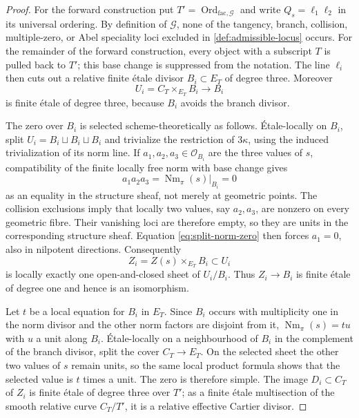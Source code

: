 \documentclass[10pt]{amsart}
\numberwithin{equation}{section}
\theoremstyle{definition}
\theoremstyle{remark}
\newcommand{\Nm}{\operatorname{Nm}}
\begin{document}
\begin{proof}
For the forward construction put
$T'=\operatorname{Ord}_{\mathrm{fac},\mathscr G}$ and write
$Q_s=\ell_1\ell_2$ in its universal ordering.  By definition of
$\mathscr G$, none of the tangency, branch, collision, multiple-zero, or Abel
speciality loci excluded in \cref{def:admissible-locus} occurs.  For the
remainder of the forward construction, every object with a subscript $T$ is
pulled back to $T'$; this base change is suppressed from the notation.
The line $\ell_i$ then
cuts out a relative finite \'etale divisor $B_i\subset E_T$ of degree three.
Moreover
\[
 U_i=C_T\times_{E_T}B_i\longrightarrow B_i
\]
is finite \'etale of degree three, because $B_i$ avoids the branch divisor.

The zero over $B_i$ is selected scheme-theoretically as follows.  \'Etale-locally on
$B_i$, split $U_i=B_i\sqcup B_i\sqcup B_i$ and trivialize the restriction
of $3\kappa$, using the induced trivialization of its norm line.  If
$a_1,a_2,a_3\in\mathcal O_{B_i}$ are the three values of $s$, compatibility
of the finite locally free norm with base change gives
\begin{equation}
 a_1a_2a_3=\Nm_\pi(s)|_{B_i}=0
\label{eq:split-norm-zero}
\end{equation}
as an equality in the structure sheaf, not merely at geometric points.
The collision exclusions imply that locally two values, say $a_2,a_3$, are
nonzero on every geometric fibre.  Their vanishing loci are therefore empty,
so they are units in the corresponding structure sheaf.  Equation
\eqref{eq:split-norm-zero} then forces $a_1=0$, also in nilpotent directions.
Consequently
\[
 Z_i=Z(s)\times_{E_T}B_i\subset U_i
\]
is locally exactly one open-and-closed sheet of $U_i/B_i$.  Thus
$Z_i\to B_i$ is finite \'etale of degree one and hence is an isomorphism.

Let $t$ be a local equation for $B_i$ in $E_T$.  Since $B_i$ occurs with
multiplicity one in the norm divisor and the other norm factors are
disjoint from it, $\Nm_\pi(s)=t u$ with $u$ a unit along $B_i$.  \'Etale-locally
on a neighbourhood of $B_i$ in the complement of the branch divisor, split
the cover $C_T\to E_T$.  On the selected sheet the other two values of $s$
remain units, so the same local product formula shows that the selected
value is $t$ times a unit.
The zero is therefore simple.  The image $D_i\subset C_T$ of $Z_i$ is
finite \'etale of degree three over $T'$; as a finite \'etale multisection of
the smooth relative curve $C_T/T'$, it is a relative effective Cartier
divisor.


\end{proof}
\end{document}
